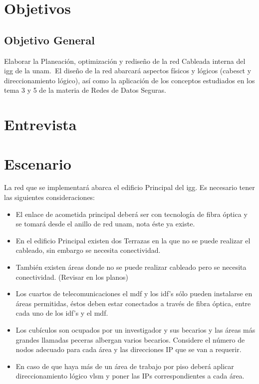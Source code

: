 \documentclass[letterpaper]{article}
\begin{document}
\section{Objetivos}\label{sec:obj}

\subsection{Objetivo General}\label{sec:objgen}

Elaborar la Planeación, optimización y rediseño de la red Cableada interna del
\acrfull{igg} de la \acrshort{unam}.\ El diseño de la red abarcará aspectos físicos
y lógicos (\gls{cabesct} y direccionamiento lógico), así como la
aplicación de los conceptos estudiados en los tema 3 y 5 de la materia de Redes
de Datos Seguras.

\section{Entrevista}\label{sec:entre}



\newpage{}

\section{Escenario}\label{sec:esc}

La red que se implementará abarca el edificio Principal del \acrfull{igg}.
Es necesario tener las siguientes consideraciones:
\begin{itemize}
\item El enlace de acometida principal deberá ser con tecnología de fibra
  óptica y se tomará desde el anillo de red \acrshort{unam}, nota éste ya existe.
  
\item  En el edificio Principal existen dos Terrazas en la que no se puede realizar
el cableado, sin embargo se necesita conectividad.

\item También existen áreas donde no se puede realizar cableado pero se
  necesita conectividad. (Revisar en los planos)
  
\item  Los cuartos de telecomunicaciones el \acrshort{mdf} y los \acrshort{idf}’s sólo pueden
instalarse en áreas permitidas, éstos deben estar conectados a través de
fibra óptica, entre cada uno de los  \acrshort{idf}'s y el \acrshort{mdf}.\@

\item Los cubículos son ocupados por un investigador y sus becarios y las áreas
más grandes llamadas peceras albergan varios becarios. Considere el
número de nodos adecuado para cada área y las direcciones IP que se
van a requerir.

\item  En caso de que haya más de un área de trabajo por piso deberá aplicar
direccionamiento lógico \acrshort{vlsm} y poner las IPs correspondientes a cada
área.
\end{itemize}
\end{document}
